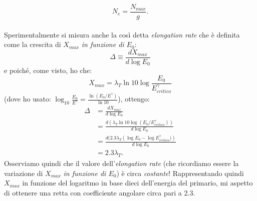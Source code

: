 \documentclass[10pt,a4paper,usenatbib]{article}
\begin{document}
\begin{equation}
N_e = \frac{N_{max}}{g}. 
\label{eqn:gNe}
\end{equation}
\\Sperimentalmente si misura anche la così detta \textit{elongation rate} che è definita come la crescita di $X_{max}$ \textit{in funzione di $E_0$}:  
\begin{equation}
\Delta \equiv \frac{dX_{max}}{d\log{E_0}} 
\end{equation}
e poiché, come visto, ho che: 
\begin{equation}
X_{max} = \lambda_T \ln{10} \log{\frac{E_0}{E_{critico}^\gamma}}
\label{eqn:Xmax}
\end{equation}
(dove ho usato: $\log_{10}{\frac{E_0}{E^\gamma}} = \frac{\ln{(E_0/E^\gamma)}}{\ln{10}}$), ottengo: 
\begin{equation}
\begin{split}
\Delta &= \frac{dX_{max}}{d\log{E_0}} \\
&= \frac{d(\lambda_T \ln{10} \log{(E_0/E^\gamma_{critico})})}{d\log{E_0}} \\
&= \frac{d(2.3\lambda_T (\log{E_0} - \log{E^\gamma_{critico})})}{d\log{E_0}} \\
&= 2.3\lambda_T. 
\end{split}
\end{equation}
Osserviamo quindi che il valore dell'\textit{elongation rate} (che ricordiamo essere la variazione di $X_{max}$ \textit{in funzione di $E_0$}) è circa \textit{costante}! Rappresentando quindi $X_{max}$ in funzione del logaritmo in base dieci dell'energia del primario, mi aspetto di ottenere una retta con coefficiente angolare circa pari a 2.3. 





\end{document}
